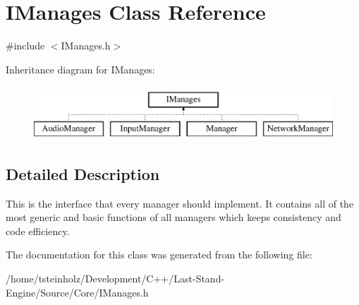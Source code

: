 \hypertarget{classIManages}{}\section{I\+Manages Class Reference}
\label{classIManages}


{\ttfamily \#include $<$I\+Manages.\+h$>$}

Inheritance diagram for I\+Manages\+:\begin{figure}[H]
\begin{center}
\leavevmode
\includegraphics[height=2.000000cm]{classIManages}
\end{center}
\end{figure}


\subsection{Detailed Description}
This is the interface that every manager should implement. It contains all of the most generic and basic functions of all managers which keeps consistency and code efficiency. 

The documentation for this class was generated from the following file\+:\begin{DoxyCompactItemize}
\item 
/home/tsteinholz/\+Development/\+C++/\+Last-\/\+Stand-\/\+Engine/\+Source/\+Core/I\+Manages.\+h\end{DoxyCompactItemize}
